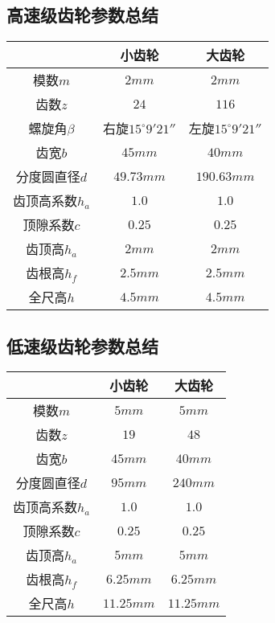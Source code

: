 \subsection{高速级齿轮参数总结}
\begin{tabular}{|c|c|c|}
    \hline
        & 小齿轮&大齿轮\\
    \hline
    模数$m$ & $2mm$ & $2mm$\\
    \hline
    齿数$z$&$24$&$116$\\
    \hline
    螺旋角$\beta$&右旋$15^\circ 9'21''$&左旋$15^\circ 9'21''$\\
    \hline
    齿宽$b$&$45mm$&$40mm$\\
    \hline
    分度圆直径$d$&$49.73mm$&$190.63mm$\\
    \hline
    齿顶高系数$h_a$&$1.0$&$1.0$\\
    \hline
    顶隙系数$c$&$0.25$&$0.25$\\
    \hline
    齿顶高$h_a$&$2mm$&$2mm$\\
    \hline
    齿根高$h_f$&$2.5mm$&$2.5mm$\\
    \hline
    全尺高$h$&$4.5mm$&$4.5mm$\\
    \hline
\end{tabular}

\subsection{低速级齿轮参数总结}
\begin{tabular}{|c|c|c|}
    \hline
        & 小齿轮&大齿轮\\
    \hline
    模数$m$ & $5mm$ & $5mm$\\
    \hline
    齿数$z$&$19$&$48$\\
    \hline
    齿宽$b$&$45mm$&$40mm$\\
    \hline
    分度圆直径$d$&$95mm$&$240mm$\\
    \hline
    齿顶高系数$h_a$&$1.0$&$1.0$\\
    \hline
    顶隙系数$c$&$0.25$&$0.25$\\
    \hline
    齿顶高$h_a$&$5mm$&$5mm$\\
    \hline
    齿根高$h_f$&$6.25mm$&$6.25mm$\\
    \hline
    全尺高$h$&$11.25mm$&$11.25mm$\\
    \hline
\end{tabular}